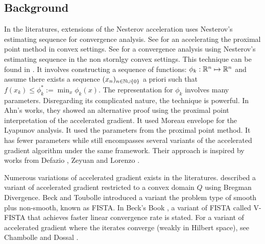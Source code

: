 \documentclass[12pt]{article}
\begin{document}

    \subsection{Background}
        In the literatures, extensions of the Nesterov acceleration uses Nesterov's estimating sequence for convergence analysis. 
        See \cite{guler_new_1992} for an accelerating the proximal point method in convex settings. 
        See \cite{necoara_linear_2019} for a convergence analysis using Nesterov's estimating sequence in the non stornlgy convex settings. 
        This technique can be found in \cite[chapter 2]{nesterov_lectures_2018}. 
        It involves constructing a sequence of functions: $\phi_k:\mathbb R^n \mapsto \mathbb R^n$ and assume there exists a sequence $(x_n)_{n\in \mathbb N \cup \{0\}}$ a priori such that $f(x_k) \le \phi_k^* := \min_x \phi_k(x)$. 
        The representation for $\phi_k$ involves many parameters. 
        Disregarding its complicated nature, the technique is powerful. 
        In Ahn's works, they showed an alternative proof using the proximal point interpretation of the  accelerated gradient. 
        It used Moreau envelope for the Lyapunov analysis.
        It used the parameters from the proximal point method. 
        It has fewer parameters while still encompasses several variants of the accelerated gradient algorithm under the same framework. 
        Their approach is inspired by works from Defazio \cite{defazio_curved_2019}, Zeyuan and Lorenzo \cite{allen-zhu_linear_2016}. 

        \par
        Numerous variations of accelerated gradient exists in the literatures. \cite[(6.1.19)]{nesterov_lectures_2018} described a variant of accelerated gradient restricted to a convex domain $Q$ using Bregman Divergence. 
        Beck and Toubolle \cite{beck_fast_2009} introduced a variant the problem type of smooth plus non-smooth, known as FISTA. 
        In Beck's Book \cite[(10.7.7)]{beck_first-order_2017}, a variant of FISTA called V-FISTA that achieves faster linear convergence rate is stated. 
        For a variant of accelerated gradient where the iterates converge (weakly in Hilbert space), see Chambolle and Dossal \cite{chambolle_convergence_2015}. 
        
\end{document}
